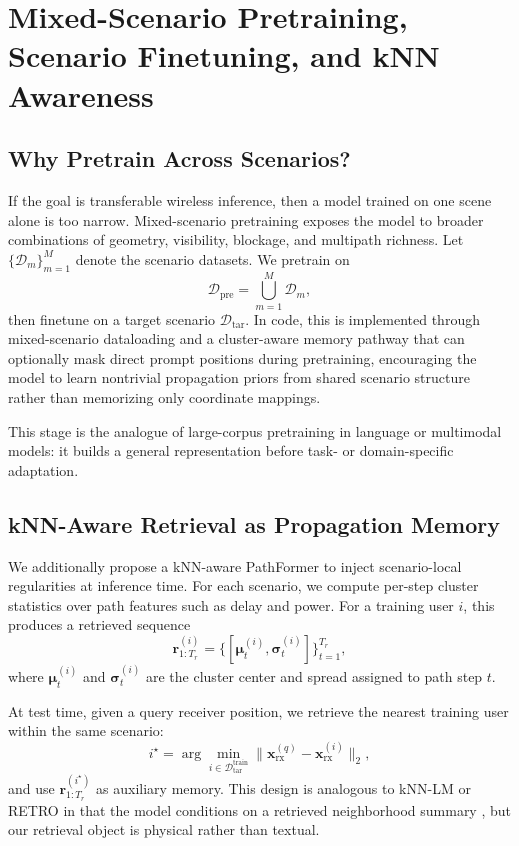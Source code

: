 \documentclass[11pt]{article}
\begin{document}
\section{Mixed-Scenario Pretraining, Scenario Finetuning, and kNN Awareness}
\subsection{Why Pretrain Across Scenarios?}
If the goal is transferable wireless inference, then a model trained on one scene alone is too narrow. Mixed-scenario pretraining exposes the model to broader combinations of geometry, visibility, blockage, and multipath richness. Let $\{\mathcal{D}_m\}_{m=1}^{M}$ denote the scenario datasets. We pretrain on
\begin{equation}
\mathcal{D}_{\mathrm{pre}} = \bigcup_{m=1}^{M} \mathcal{D}_m,
\end{equation}
then finetune on a target scenario $\mathcal{D}_{\mathrm{tar}}$. In code, this is implemented through mixed-scenario dataloading and a cluster-aware memory pathway that can optionally mask direct prompt positions during pretraining, encouraging the model to learn nontrivial propagation priors from shared scenario structure rather than memorizing only coordinate mappings.

This stage is the analogue of large-corpus pretraining in language or multimodal models: it builds a general representation before task- or domain-specific adaptation.

\subsection{kNN-Aware Retrieval as Propagation Memory}
We additionally propose a kNN-aware PathFormer to inject scenario-local regularities at inference time. For each scenario, we compute per-step cluster statistics over path features such as delay and power. For a training user $i$, this produces a retrieved sequence
\begin{equation}
\mathbf{r}^{(i)}_{1:T_r}
=
\{[\bm{\mu}^{(i)}_t,\bm{\sigma}^{(i)}_t]\}_{t=1}^{T_r},
\end{equation}
where $\bm{\mu}^{(i)}_t$ and $\bm{\sigma}^{(i)}_t$ are the cluster center and spread assigned to path step $t$.

At test time, given a query receiver position, we retrieve the nearest training user within the same scenario:
\begin{equation}
i^{\star}
=
\arg\min_{i \in \mathcal{D}_{\mathrm{tar}}^{\mathrm{train}}}
\|\mathbf{x}^{(q)}_{\mathrm{rx}} - \mathbf{x}^{(i)}_{\mathrm{rx}}\|_2,
\end{equation}
and use $\mathbf{r}^{(i^{\star})}_{1:T_r}$ as auxiliary memory. This design is analogous to kNN-LM or RETRO in that the model conditions on a retrieved neighborhood summary \cite{knnlm,retro}, but our retrieval object is physical rather than textual.
\end{document}
